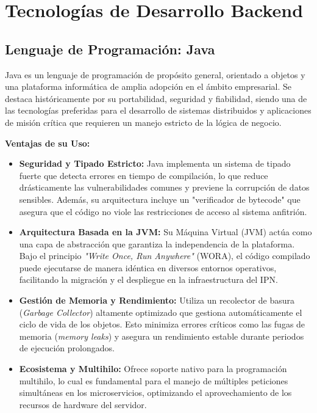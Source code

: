 \section{Tecnologías de Desarrollo Backend}

\subsection{Lenguaje de Programación: Java}
Java es un lenguaje de programación de propósito general, orientado a objetos y una plataforma informática de amplia adopción en el ámbito empresarial. Se destaca históricamente por su portabilidad, seguridad y fiabilidad, siendo una de las tecnologías preferidas para el desarrollo de sistemas distribuidos y aplicaciones de misión crítica que requieren un manejo estricto de la lógica de negocio.



\textbf{Ventajas de su Uso:}
\begin{itemize}
    \item \textbf{Seguridad y Tipado Estricto:} Java implementa un sistema de tipado fuerte que detecta errores en tiempo de compilación, lo que reduce drásticamente las vulnerabilidades comunes y previene la corrupción de datos sensibles. Además, su arquitectura incluye un "verificador de bytecode" que asegura que el código no viole las restricciones de acceso al sistema anfitrión.
    
    \item \textbf{Arquitectura Basada en la JVM:} Su Máquina Virtual (JVM) actúa como una capa de abstracción que garantiza la independencia de la plataforma. Bajo el principio \textit{"Write Once, Run Anywhere"} (WORA), el código compilado puede ejecutarse de manera idéntica en diversos entornos operativos, facilitando la migración y el despliegue en la infraestructura del IPN.
    
    \item \textbf{Gestión de Memoria y Rendimiento:} Utiliza un recolector de basura (\textit{Garbage Collector}) altamente optimizado que gestiona automáticamente el ciclo de vida de los objetos. Esto minimiza errores críticos como las fugas de memoria (\textit{memory leaks}) y asegura un rendimiento estable durante periodos de ejecución prolongados.
    
    \item \textbf{Ecosistema y Multihilo:} Ofrece soporte nativo para la programación multihilo, lo cual es fundamental para el manejo de múltiples peticiones simultáneas en los microservicios, optimizando el aprovechamiento de los recursos de hardware del servidor.
\end{itemize}


